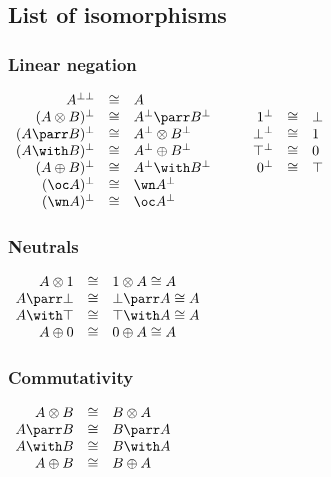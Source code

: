 \subsection{List of isomorphisms}\label{list-of-isomorphisms}

\subsubsection{Linear negation}\label{linear-negation-1}

\(\begin{array}{rclcrcl}
  A\biorth & \cong&  A\\
  (A\tens B)\orth & \cong&  A\orth\parr B\orth & \quad&  \one\orth  & \cong&  \bot\\
  (A\parr B)\orth & \cong&  A\orth\tens B\orth & \quad&  \bot\orth  & \cong&  \one\\
  (A\with B)\orth & \cong&  A\orth\plus B\orth & \quad&  \top\orth  & \cong&  \zero\\
  (A\plus B)\orth & \cong&  A\orth\with B\orth & \quad&  \zero\orth & \cong&  \top\\
  (\oc A)\orth & \cong&  \wn A\orth\\
  (\wn A)\orth & \cong&  \oc A\orth\\
\end{array}\)

\subsubsection{Neutrals}\label{neutrals}

\(\begin{array}{rcl}
  A\tens\one  & \cong&  \one\tens A\cong A\\
  A\parr\bot  & \cong&  \bot\parr A\cong A\\
  A\with\top  & \cong&  \top\with A\cong A\\
  A\plus\zero & \cong& \zero\plus A\cong A\\
\end{array}\)

\subsubsection{Commutativity}\label{commutativity-1}

\(\begin{array}{rcl}
  A\tens B & \cong&  B\tens A\\
  A\parr B & \cong&  B\parr A\\
  A\with B & \cong&  B\with A\\
  A\plus B & \cong&  B\plus A\\
\end{array}\)


